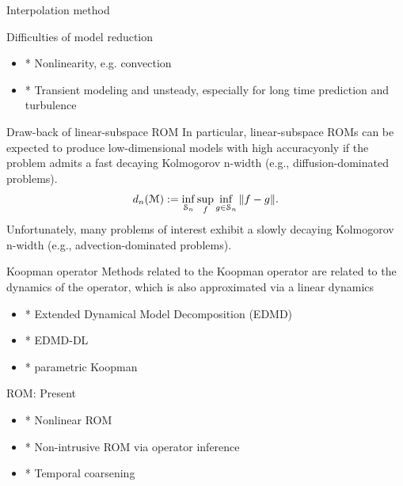 \documentclass{beamer}
\begin{document}
\begin{frame}{Interpolation method}
	\footnotemark
\end{frame}

\begin{frame}{Difficulties of model reduction}
	\begin{itemize}
		\item * Nonlinearity, e.g. convection
		\item * Transient modeling and unsteady, especially for long time prediction and turbulence
	\end{itemize}
\end{frame}

\begin{frame}{Draw-back of linear-subspace ROM}
	In particular, linear-subspace ROMs can be expected to produce
	low-dimensional models with high accuracy\footnotemark only if the problem admits a fast decaying Kolmogorov n-width
	(e.g., diffusion-dominated problems). 
	\begin{equation*}
		d_n(\mathcal{M}) := \inf_{\mathcal{S}_n}\sup_f\inf_{g\in\mathcal{S}_n}\|f-g\|.	
	\end{equation*}
	Unfortunately, many problems of interest exhibit a slowly decaying
	Kolmogorov n-width (e.g., advection-dominated problems).
\end{frame}

\begin{frame}{Koopman operator}
	Methods related to the Koopman operator are related to the dynamics of the operator,
	which is also approximated via a linear dynamics 
	\begin{itemize}
		\item * Extended Dynamical Model Decomposition (EDMD)
		\item * EDMD-DL 
		\item * parametric Koopman
	\end{itemize}
\end{frame}

\begin{frame}{ROM: Present}
	\begin{itemize}
		\item * Nonlinear ROM
		\item * Non-intrusive ROM via operator inference
		\item * Temporal coarsening
	\end{itemize}
\end{frame}
\end{document}
